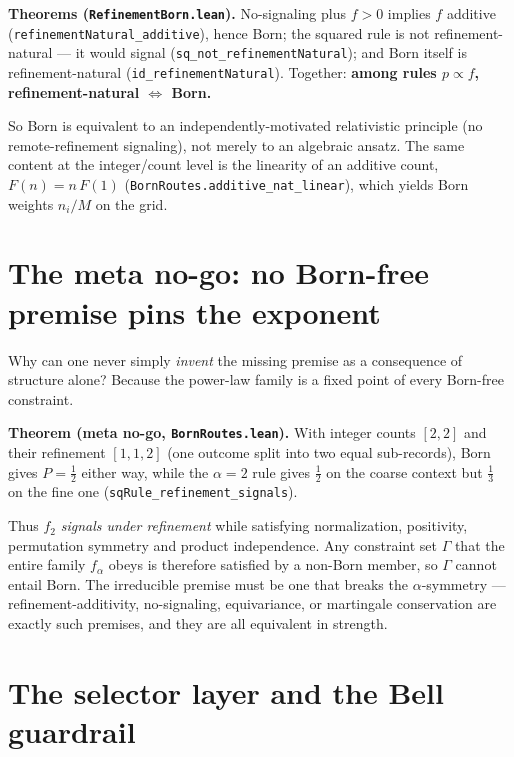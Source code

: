 \documentclass[11pt,a4paper]{article}
\newenvironment{qiqtquote}{\begin{mdframed}[style=quotestyle]}{\end{mdframed}}
\begin{document}
\begin{qiqtquote}
\textbf{Theorems (\texttt{RefinementBorn.lean}).} No-signaling plus $f>0$ implies $f$ additive
(\texttt{refinementNatural\_additive}), hence Born; the squared rule is not refinement-natural — it would signal
(\texttt{sq\_not\_refinementNatural}); and Born itself is refinement-natural (\texttt{id\_refinementNatural}). Together:
\textbf{among rules $p\propto f$, refinement-natural $\Leftrightarrow$ Born.}
\end{qiqtquote}

So Born is equivalent to an independently-motivated relativistic principle (no remote-refinement signaling),
not merely to an algebraic ansatz. The same content at the integer/count level is the linearity of an
additive count, $F(n)=n\,F(1)$ (\texttt{BornRoutes.additive\_nat\_linear}), which yields Born weights $n_i/M$ on the
grid.

\section{The meta no-go: no Born-free premise pins the exponent}

Why can one never simply \emph{invent} the missing premise as a consequence of structure alone? Because the
power-law family is a fixed point of every Born-free constraint.

\begin{qiqtquote}
\textbf{Theorem (meta no-go, \texttt{BornRoutes.lean}).} With integer counts $[2,2]$ and their refinement $[1,1,2]$
(one outcome split into two equal sub-records), Born gives $P=\tfrac12$ either way, while the $\alpha=2$
rule gives $\tfrac12$ on the coarse context but $\tfrac13$ on the fine one (\texttt{sqRule\_refinement\_signals}).
\end{qiqtquote}

Thus $f_2$ \emph{signals under refinement} while satisfying normalization, positivity, permutation symmetry and
product independence. Any constraint set $\Gamma$ that the entire family $f_\alpha$ obeys is therefore
satisfied by a non-Born member, so $\Gamma$ cannot entail Born. The irreducible premise must be one that
breaks the $\alpha$-symmetry — refinement-additivity, no-signaling, equivariance, or martingale
conservation are exactly such premises, and they are all equivalent in strength.

\section{The selector layer and the Bell guardrail}
\end{document}
